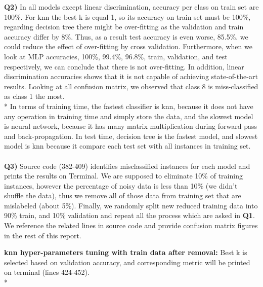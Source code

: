 \documentclass[12pt]{article}
\begin{document}
\newpage
\textbf{Q2)} In all models except linear discrimination, accuracy per class on train set are 100\%. For knn the best k is equal 1, so its accuracy on train set must be 100\%, regarding decision tree there might be over-fitting as the validation and train accuracy differ by 8\%. Thus, as a result test accuracy is even worse, 85.5\%. we could reduce the effect of over-fitting by cross validation. Furthermore, when we look at MLP accuracies, 100\%, 99.4\%, 96.8\%, train, validation, and test respectively, we can conclude that there is not over-fitting. In addition, linear discrimination accuracies shows that it is not capable of achieving state-of-the-art results. Looking at all confusion matrix, we observed that class 8 is miss-classified as class 1 the most.\\*
In terms of training time, the fastest classifier is knn, because it does not have any operation in training time and simply store the data, and the slowest model is neural network, because it has many matrix multiplication during forward pass and back-propagation. In test time, decision tree is the fastest model, and slowest model is knn because it compare each test set with all instances in training set.\\\\

\textbf{Q3)} Source code (382-409) identifies misclassified instances for each model and prints the results on Terminal. We are supposed to eliminate 10\% of training instances, however the percentage of noisy data is less than 10\% (we didn't shuffle the data), thus we remove all of those data from training set that are mislabeled (about 5\%). Finally, we randomly split new reduced training data into 90\% train, and 10\% validation and repeat all the process which are asked in \textbf{Q1}. We reference the related lines in source code and provide confusion matrix figures in the rest of this report.

\textbf{knn hyper-parameters tuning with train data after removal:} Best k is selected based on validation accuracy, and corresponding metric will be printed on terminal (lines 424-452).\\*
\end{document}
